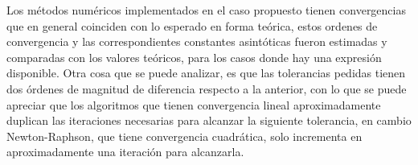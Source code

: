 
Los métodos numéricos implementados en el caso propuesto tienen convergencias que en general coinciden con lo esperado en forma teórica, estos ordenes de convergencia y las correspondientes constantes asintóticas fueron estimadas y comparadas con los valores teóricos, para los casos donde hay una expresión disponible. Otra cosa que se puede analizar, es que las tolerancias pedidas tienen dos órdenes de magnitud de diferencia respecto a la anterior, con lo que se puede apreciar que los algoritmos que tienen convergencia lineal aproximadamente duplican las iteraciones necesarias para alcanzar la siguiente tolerancia, en cambio Newton-Raphson, que tiene convergencia cuadrática, solo incrementa en aproximadamente una iteración para alcanzarla.